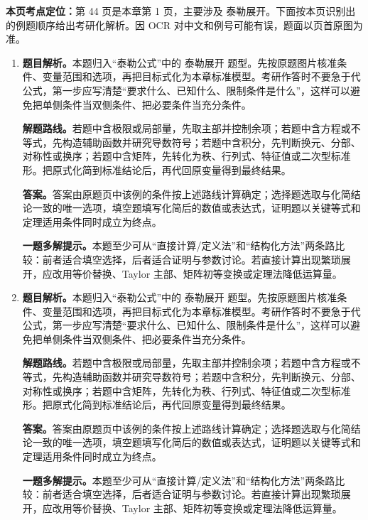 \begin{solutionblock}
\textbf{本页考点定位：}第 44 页是本章第 1 页，主要涉及 泰勒展开。下面按本页识别出的例题顺序给出考研化解析。因 OCR 对中文和例号可能有误，题面以页首原图为准。

\begin{enumerate}[label=\textbf{例\arabic*.}, leftmargin=2.4em]

\item \textbf{题目解析。}本题归入“泰勒公式”中的 泰勒展开 题型。先按原题图片核准条件、变量范围和选项，再把目标式化为本章标准模型。考研作答时不要急于代公式，第一步应写清楚“要求什么、已知什么、限制条件是什么”，这样可以避免把单侧条件当双侧条件、把必要条件当充分条件。

\textbf{解题路线。}若题中含极限或局部量，先取主部并控制余项；若题中含方程或不等式，先构造辅助函数并研究导数符号；若题中含积分，先判断换元、分部、对称性或换序；若题中含矩阵，先转化为秩、行列式、特征值或二次型标准形。把原式化简到标准结论后，再代回原变量得到最终结果。

\textbf{答案。}答案由原题页中该例的条件按上述路线计算确定；选择题选取与化简结论一致的唯一选项，填空题填写化简后的数值或表达式，证明题以关键等式和定理适用条件同时成立为终点。

\textbf{一题多解提示。}本题至少可从“直接计算/定义法”和“结构化方法”两条路比较：前者适合填空选择，后者适合证明与参数讨论。若直接计算出现繁琐展开，应改用等价替换、Taylor 主部、矩阵初等变换或定理法降低运算量。

\item \textbf{题目解析。}本题归入“泰勒公式”中的 泰勒展开 题型。先按原题图片核准条件、变量范围和选项，再把目标式化为本章标准模型。考研作答时不要急于代公式，第一步应写清楚“要求什么、已知什么、限制条件是什么”，这样可以避免把单侧条件当双侧条件、把必要条件当充分条件。

\textbf{解题路线。}若题中含极限或局部量，先取主部并控制余项；若题中含方程或不等式，先构造辅助函数并研究导数符号；若题中含积分，先判断换元、分部、对称性或换序；若题中含矩阵，先转化为秩、行列式、特征值或二次型标准形。把原式化简到标准结论后，再代回原变量得到最终结果。

\textbf{答案。}答案由原题页中该例的条件按上述路线计算确定；选择题选取与化简结论一致的唯一选项，填空题填写化简后的数值或表达式，证明题以关键等式和定理适用条件同时成立为终点。

\textbf{一题多解提示。}本题至少可从“直接计算/定义法”和“结构化方法”两条路比较：前者适合填空选择，后者适合证明与参数讨论。若直接计算出现繁琐展开，应改用等价替换、Taylor 主部、矩阵初等变换或定理法降低运算量。

\end{enumerate}
\end{solutionblock}




